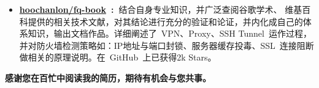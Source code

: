 \documentclass[a4paper,12pt]{article}
\newcommand{\mydash}{
    \noindent\makebox[16cm]{
        \textcolor{gray!70}{
            \hdashrule{16cm}{2.5pt}{2.5pt}
        }
    }
    \vspace{-7ex}
}
\begin{document}
\begin{CJK*}{UTF8}{gbsn}
\begin{itemize}
            \item \textbf{\href{https://github.com/hoochanlon/fq-book}{hoochanlon/fq-book}~:~}{结合自身专业知识，并广泛查阅谷歌学术、
            维基百科提供的相关技术文献，对其结论进行充分的验证和论证，并内化成自己的体系知识，输出文档作品。详细阐述了~VPN、Proxy、SSH Tunnel~运作过程，并对防火墙检测策略如：IP地址与端口封锁、服务器缓存投毒、SSL~连接阻断做相关的原理说明。在~GitHub~上已获得2k Stars。}
        \end{itemize}


        \mydash
        \begin{center}
             \textbf{
                \fontsize{15}{14}
                \textcolor{red!40!brown}{感谢您在百忙中阅读我的简历，期待有机会与您共事。}
             }
        \end{center}

    \end{CJK*}
\end{document}
